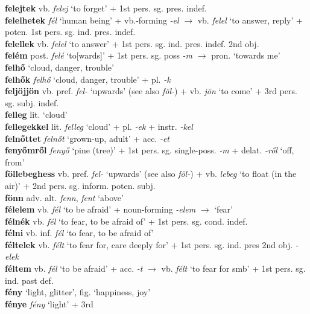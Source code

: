 \documentclass[11pt]{article}
\begin{document}
\textbf{felejtek} vb. \emph{felej} `to forget' + 1st pers. sg. pres. indef. \\
\textbf{felelhetek} \emph{fél} `human being' + vb.-forming \emph{-el}
$\rightarrow$ vb. \emph{felel} `to answer, reply' + poten. 1st
pers. sg. ind. pres. indef. \\
\textbf{felellek} vb. \emph{felel} `to answer' + 1st
pers. sg. ind. pres. indef. 2nd obj. \\
\textbf{felém} post. \emph{felé} `to[wards]' + 1st
pers. sg. poss \emph{-m} $\rightarrow$ pron. `towards me' \\
\textbf{felhő} `cloud, danger, trouble' \\
\textbf{felhők} \emph{felhő} `cloud, danger, trouble' +
pl. \emph{-k} \\
\textbf{feljöjjön} vb. pref. \emph{fel-} `upwards' (see
also \emph{föl-}) + vb. \emph{jön} `to come' + 3rd
pers. sg. subj. indef. \\
\textbf{felleg} lit. `cloud' \\
\textbf{fellegekkel} lit. \emph{felleg} `cloud' + pl. \emph{-ek} +
instr. \emph{-kel} \\
\textbf{felnőttet} \emph{felnőt} `grown-up, adult' + acc. \emph{-et} \\
\textbf{fenyőmről} \emph{fenyő} `pine (tree)' + 1st pers. sg. single\hyp{}poss. \emph{-m} +
delat. \emph{-ről} `off, from' \\
\textbf{föllebeghess} vb. pref. \emph{fel-} `upwards' (see
also \emph{föl-}) + vb. \emph{lebeg} `to float (in the air)' + 2nd
pers. sg. inform. poten. subj. \\
\textbf{fönn} adv. alt. \emph{fenn}, \emph{fent} `above' \\
\textbf{félelem} vb. \emph{fél} `to be afraid' +
noun\hyp{}forming \emph{-elem} $\rightarrow$ `fear' \\
\textbf{félnék} vb. \emph{fél} `to fear, to be afraid of' + 1st
pers. sg. cond. indef. \\
\textbf{félni} vb. inf. \emph{fél} `to fear, to be afraid of' \\
\textbf{féltelek} vb. \emph{félt} `to fear for, care deeply for' +  1st pers. sg. ind. pres 2nd obj. \emph{-elek} \\
\textbf{féltem} vb. \emph{fél} `to be afraid' + acc. \emph{-t}
$\rightarrow$ vb. \emph{félt} `to fear for smb' + 1st
pers. sg. ind. past def. \\
\textbf{fény} `light,  glitter', fig. `happiness, joy' \\
\textbf{fénye} \emph{fény} `light' + 3rd
\end{document}
